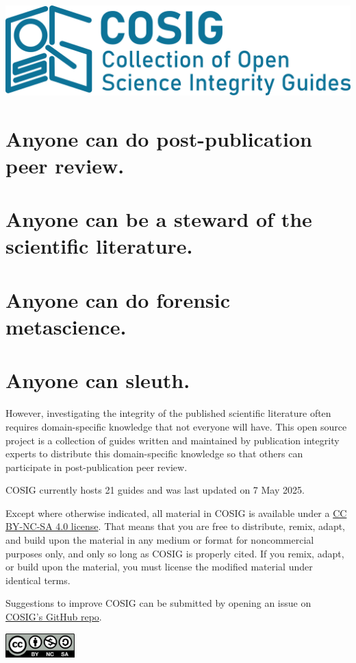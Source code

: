 \documentclass[letterpaper, 12pt]{article}
\begin{document}
\flushleft
\includegraphics[width=\textwidth]{img/home/241017_final_logo_mockup.png}

\section*{Anyone can do post-publication peer review.}
\section*{Anyone can be a steward of the scientific literature.}
\section*{Anyone can do forensic metascience.}
\section*{Anyone can sleuth.}

However, investigating the integrity of the published scientific literature often requires domain-specific knowledge that not everyone will have. This open source project is a collection of guides written and maintained by publication integrity experts to distribute this domain-specific knowledge so that others can participate in post-publication peer review.

COSIG currently hosts 21 guides and was last updated on 7 May 2025.

Except where otherwise indicated, all material in COSIG is available under a \href{https://creativecommons.org/licenses/by-nc-sa/4.0/deed.en}{CC BY-NC-SA 4.0 license}. That means that you are free to distribute, remix, adapt, and build upon the material in any medium or format for noncommercial purposes only, and only so long as COSIG is properly cited. If you remix, adapt, or build upon the material, you must license the modified material under identical terms.

Suggestions to improve COSIG can be submitted by opening an issue on \href{https://github.com/reeserich/cosig/issues}{COSIG's GitHub repo}.

\includegraphics[width=0.2\textwidth]{img/home/Cc-by-nc-sa_icon.svg.png}
\end{document}

